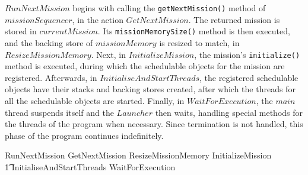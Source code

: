 $RunNextMission$ begins with calling the \texttt{getNextMission()}
method of $missionSequencer$, in the action $GetNextMission$.
The returned mission is stored in $currentMission$.
Its \texttt{missionMemorySize()} method is then executed, and the
backing store of $missionMemory$ is resized to match, in
$ResizeMissionMemory$.
Next, in $InitializeMission$, the mission's \texttt{initialize()}
method is executed, during which the schedulable objects for the
mission are registered.
Afterwards, in $InitialiseAndStartThreads$, the registered schedulable
objects have their stacks and backing stores created, after which the
threads for all the schedulable objects are started.
Finally, in $WaitForExecution$, the $main$ thread suspends itself and
the $Launcher$ then waits, handling special methods for the threads of
the program when necessary.
Since termination is not handled, this phase of the program continues
indefinitely.
\begin{circusaction}
  RunNextMission \circdef GetNextMission \circseq ResizeMissionMemory \circseq InitializeMission \circseq \\
  \t1 InitialiseAndStartThreads \circseq WaitForExecution
\end{circusaction}

